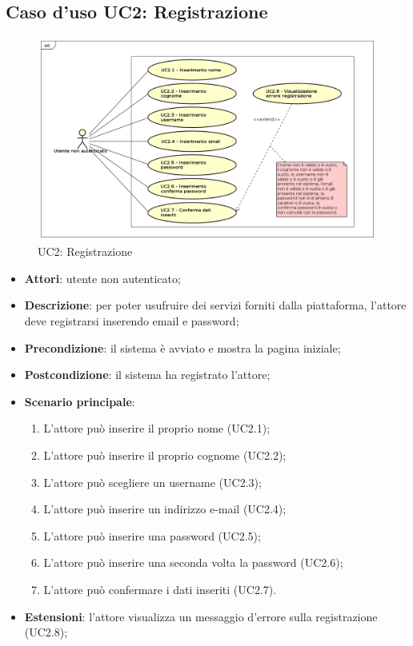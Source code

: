 \newpage
\subsection{Caso d'uso UC2: Registrazione}
\label{UC2}
\begin{figure}
	\includegraphics[scale=0.45]{UML/UC2.png}
	\caption{UC2: Registrazione}
\end{figure}
\begin{itemize}
\item \textbf{Attori}: utente non autenticato;
\item \textbf{Descrizione}: per poter usufruire dei servizi forniti dalla piattaforma, l'attore deve registrarsi inserendo email e password;
\item \textbf{Precondizione}: il sistema è avviato e mostra la pagina iniziale;
\item \textbf{Postcondizione}: il sistema ha registrato l'attore;
\item \textbf{Scenario principale}:
	\begin{enumerate}
	\item L'attore può inserire il proprio nome (UC2.1);
	\item L'attore può inserire il proprio cognome (UC2.2);
	\item L'attore può scegliere un username (UC2.3);
	\item L'attore può inserire un indirizzo e-mail (UC2.4);
	\item L'attore può inserire una password (UC2.5);
	\item L'attore può inserire una seconda volta la password (UC2.6);
	\item L'attore può confermare i dati inseriti (UC2.7).
	\end{enumerate}
\item \textbf{Estensioni}: l'attore visualizza un messaggio d'errore sulla registrazione (UC2.8);
\end{itemize}

